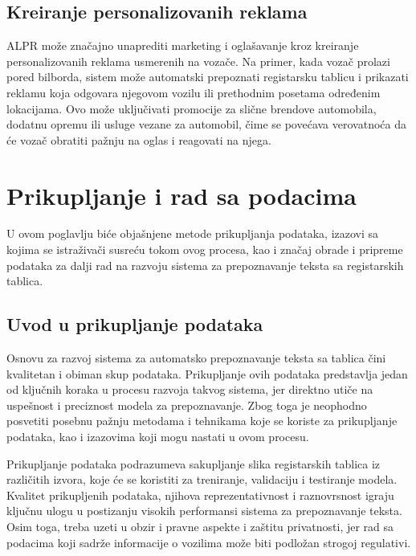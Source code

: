 \documentclass[a4paper,12pt]{article}
\begin{document}
	\subsection{Kreiranje personalizovanih reklama}
	ALPR može značajno unaprediti marketing i oglašavanje kroz kreiranje personalizovanih reklama usmerenih na vozače. Na primer, kada vozač prolazi pored bilborda, sistem može automatski prepoznati registarsku tablicu i prikazati reklamu koja odgovara njegovom vozilu ili prethodnim posetama određenim lokacijama. Ovo može uključivati promocije za slične brendove automobila, dodatnu opremu ili usluge vezane za automobil, čime se povećava verovatnoća da će vozač obratiti pažnju na oglas i reagovati na njega.
	\newpage
	
	\section{Prikupljanje i rad sa podacima}
	U ovom poglavlju biće objašnjene metode prikupljanja podataka, izazovi sa kojima se istraživači susreću tokom ovog procesa, kao i značaj obrade i pripreme podataka za dalji rad na razvoju sistema za prepoznavanje teksta sa registarskih tablica.
	
	\subsection{Uvod u prikupljanje podataka}
	Osnovu za razvoj sistema za automatsko prepoznavanje teksta sa tablica čini kvalitetan i obiman skup podataka. Prikupljanje ovih podataka predstavlja jedan od ključnih koraka u procesu razvoja takvog sistema, jer direktno utiče na uspešnost i preciznost modela za prepoznavanje. Zbog toga je neophodno posvetiti posebnu pažnju metodama i tehnikama koje se koriste za prikupljanje podataka, kao i izazovima koji mogu nastati u ovom procesu.
	
	Prikupljanje podataka podrazumeva sakupljanje slika registarskih tablica iz različitih izvora, koje će se koristiti za treniranje, validaciju i testiranje modela. Kvalitet prikupljenih podataka, njihova reprezentativnost i raznovrsnost igraju ključnu ulogu u postizanju visokih performansi sistema za prepoznavanje teksta. Osim toga, treba uzeti u obzir i pravne aspekte i zaštitu privatnosti, jer rad sa podacima koji sadrže informacije o vozilima može biti podložan strogoj regulativi.
	
\end{document}
